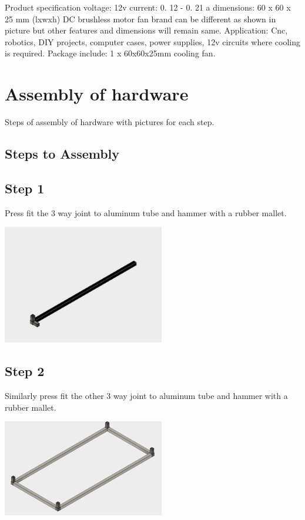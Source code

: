 \documentclass[a4paper,12pt,oneside]{book}
\begin{document}
\begin{enumerate}
  Product specification voltage: 12v current: 0. 12 - 0. 21 a dimensions: 60 x 60 x 25 mm (lxwxh) DC brushless motor fan brand can be different as shown in picture but other features and dimensions will remain same. Application: Cnc, robotics, DIY projects, computer cases, power supplies, 12v circuits where cooling is required. Package include: 1 x 60x60x25mm cooling fan.
  \end{enumerate}


\section{Assembly of hardware}
Steps of assembly of hardware with pictures for each step.
\subsection*{Steps to Assembly}
\subsection*{Step 1}
Press fit the 3 way joint to aluminum tube and hammer with a rubber mallet.\\
\begin{center}
  \includegraphics[width=200pt]{1}
  \end{center}
\subsection*{Step 2}
Similarly press fit the other 3 way joint to aluminum tube and hammer with a rubber mallet.\\
\begin{center}
  \includegraphics[width=200pt]{2}
  \end{center}
\end{document}
